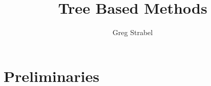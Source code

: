\documentclass[11pt]{article}
\author{Greg Strabel}
\title{Tree Based Methods}
\begin{document}
\maketitle
\section{Preliminaries}
\end{document}
